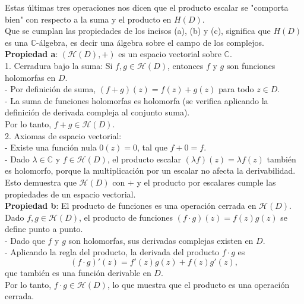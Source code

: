 \documentclass{article}
\theoremstyle{nonumberplain}
\begin{document}
Estas últimas tres operaciones nos dicen que el producto escalar se "comporta bien" con respecto a la suma y el producto en $H(D)$. \\
Que se cumplan las propiedades de los incisos (a), (b) y (c), significa que $H(D)$ es una $\mathbb{C}$-álgebra, es decir una álgebra sobre el campo de los complejos. \\
\textbf{Propiedad a}: \( (\mathcal{H}(D), +) \) es un espacio vectorial sobre \(\mathbb{C}\).\\
1. Cerradura bajo la suma:
   Si \(f, g \in \mathcal{H}(D)\), entonces \(f\) y \(g\) son funciones holomorfas en \(D\). \\
   - Por definición de suma, \((f+g)(z) = f(z) + g(z)\) para todo \(z \in D\).  \\
   - La suma de funciones holomorfas es holomorfa (se verifica aplicando la definición de derivada compleja al conjunto suma). \\
   Por lo tanto, \(f+g \in \mathcal{H}(D)\). \\
2. Axiomas de espacio vectorial: \\
   - Existe una función nula \(0(z) = 0\), tal que \(f+0 = f\). \\
   - Dado \(\lambda \in \mathbb{C}\) y \(f \in \mathcal{H}(D)\), el producto escalar \((\lambda f)(z) = \lambda f(z)\) también es holomorfo, porque la multiplicación por un escalar no afecta la derivabilidad.  \\

   Esto demuestra que \( \mathcal{H}(D) \) con \(+\) y el producto por escalares cumple las propiedades de un espacio vectorial. \\

\textbf{Propiedad b}: El producto de funciones es una operación cerrada en \( \mathcal{H}(D) \). \\

Dado \(f, g \in \mathcal{H}(D)\), el producto de funciones \( (f \cdot g)(z) = f(z)g(z) \) se define punto a punto.  \\
- Dado que \(f\) y \(g\) son holomorfas, sus derivadas complejas existen en \(D\).  \\
- Aplicando la regla del producto, la derivada del producto \(f \cdot g\) es  
  \[
  (f \cdot g)'(z) = f'(z)g(z) + f(z)g'(z),
  \]  
  que también es una función derivable en \(D\).  \\

Por lo tanto, \(f \cdot g \in \mathcal{H}(D)\), lo que muestra que el producto es una operación cerrada.
\end{document}
